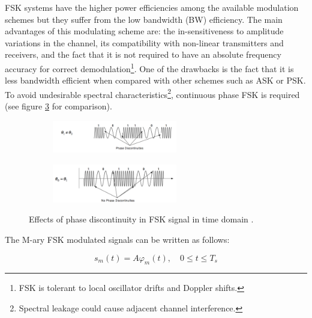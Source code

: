 \documentclass[12pt,a4paper,openright]{report}
\begin{document}
 FSK systems have the higher power efficiencies among the available modulation schemes but they suffer from the low bandwidth (BW) efficiency. The main advantages of this modulating scheme are: the in-sensitiveness to amplitude variations in the channel, its compatibility with non-linear transmitters and receivers, and the fact that it is not required to have an absolute frequency accuracy for correct demodulation\footnote{FSK is tolerant to local oscillator drifts and Doppler shifts.}. One of the drawbacks is the fact that it is less bandwidth efficient when compared with other schemes such as ASK or PSK. To avoid undesirable spectral characteristics\footnote{Spectral leakage could cause adjacent channel interference.}, continuous phase FSK is required (see figure \ref{fig:comparecpfsk} for comparison).
%
 \begin{figure}[H]
 \centering
	\begin{subfigure}[H]{0.9\textwidth}
 \centering
    \includegraphics[width=0.6\textwidth]{ncpfsk.pdf}
    \label{fig:FSKcoherent}

	\end{subfigure}
	\quad

	\begin{subfigure}[H]{0.9\textwidth}
 	\centering
    \includegraphics[width=0.6\textwidth]{cpfsk.pdf}
    \label{fig:FSKnoncoherent}
 	\end{subfigure}
    \caption[Effects of phase discontinuity in FSK signal]{Effects of phase discontinuity in FSK signal in time domain \cite{DigCommLec}.}
    \label{fig:comparecpfsk}
\end{figure}

The M-ary FSK modulated signals can be written as follows:

\begin{equation}\label{Eq:M-FSK symbol 2}
{s_m}(t) = A{\varphi _m}(t),\quad 0 \le t \le T_s
\end{equation}
\end{document}
